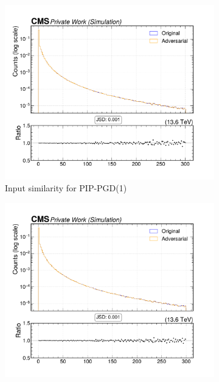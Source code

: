 \begin{figure}[htbp]
  \centering
  \begin{subfigure}[t]{0.32\textwidth}
    \includegraphics[width=\linewidth]{media/output/features/compare/combined_it_1/cmp_cpf_arr_Cpfcan_BtagPf_trackPPar.pdf}
    \caption*{Input similarity for PIP-PGD(1)}
  \end{subfigure}\hfill
  \begin{subfigure}[t]{0.32\textwidth}
    \includegraphics[width=\linewidth]{media/output/features/compare/combined_it_2/cmp_cpf_arr_Cpfcan_BtagPf_trackPPar.pdf}

\end{subfigure}
\end{figure}
